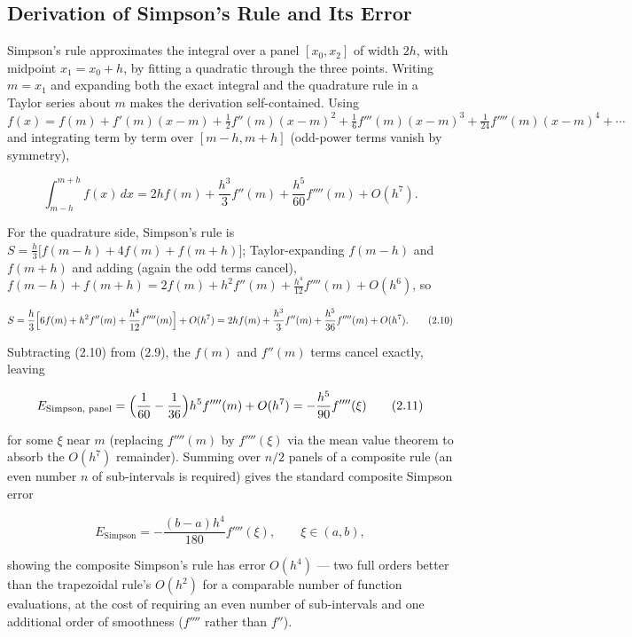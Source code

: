 \documentclass[
]{article}
\begin{document}
\subsection{Derivation of Simpson's Rule and Its
Error}\label{derivation-of-simpsons-rule-and-its-error}

Simpson's rule approximates the integral over a panel \([x_0,x_2]\) of
width \(2h\), with midpoint \(x_1=x_0+h\), by fitting a quadratic
through the three points. Writing \(m=x_1\) and expanding both the exact
integral and the quadrature rule in a Taylor series about \(m\) makes
the derivation self-contained. Using
\(f(x)=f(m)+f'(m)(x-m)+\tfrac12f''(m)(x-m)^2+\tfrac16f'''(m)(x-m)^3
+\tfrac{1}{24}f''''(m)(x-m)^4+\cdots\) and integrating term by term over
\([m-h,m+h]\) (odd-power terms vanish by symmetry),

\[
\int_{m-h}^{m+h} f(x)\,dx = 2h f(m) + \frac{h^3}{3}f''(m)
+ \frac{h^5}{60}f''''(m) + O(h^7).
\tag{2.9}
\]

For the quadrature side, Simpson's rule is
\(S = \tfrac{h}{3}\bigl[f(m-h)+4f(m)+f(m+h)\bigr]\); Taylor-expanding
\(f(m-h)\) and \(f(m+h)\) and adding (again the odd terms cancel),
\(f(m-h)+f(m+h) = 2f(m)+h^2f''(m)+\tfrac{h^4}{12}f''''(m)+O(h^6)\), so

\[
S = \frac{h}{3}\Bigl[6f(m) + h^2 f''(m) + \frac{h^4}{12}f''''(m)\Bigr] + O(h^7)
= 2hf(m) + \frac{h^3}{3}f''(m) + \frac{h^5}{36}f''''(m) + O(h^7).
\tag{2.10}
\]

Subtracting (2.10) from (2.9), the \(f(m)\) and \(f''(m)\) terms cancel
exactly, leaving

\[
E_{\text{Simpson, panel}} = \Bigl(\frac{1}{60}-\frac{1}{36}\Bigr)h^5 f''''(m) + O(h^7)
= -\frac{h^5}{90}f''''(\xi)
\tag{2.11}
\]

for some \(\xi\) near \(m\) (replacing \(f''''(m)\) by \(f''''(\xi)\)
via the mean value theorem to absorb the \(O(h^7)\) remainder). Summing
over \(n/2\) panels of a composite rule (an even number \(n\) of
sub-intervals is required) gives the standard composite Simpson error

\[
E_{\text{Simpson}} = -\frac{(b-a)h^4}{180} f''''(\xi), \qquad \xi\in(a,b),
\tag{2.12}
\]

showing the composite Simpson's rule has error \(O(h^4)\) --- two full
orders better than the trapezoidal rule's \(O(h^2)\) for a comparable
number of function evaluations, at the cost of requiring an even number
of sub-intervals and one additional order of smoothness (\(f''''\)
rather than \(f''\)).
\end{document}
